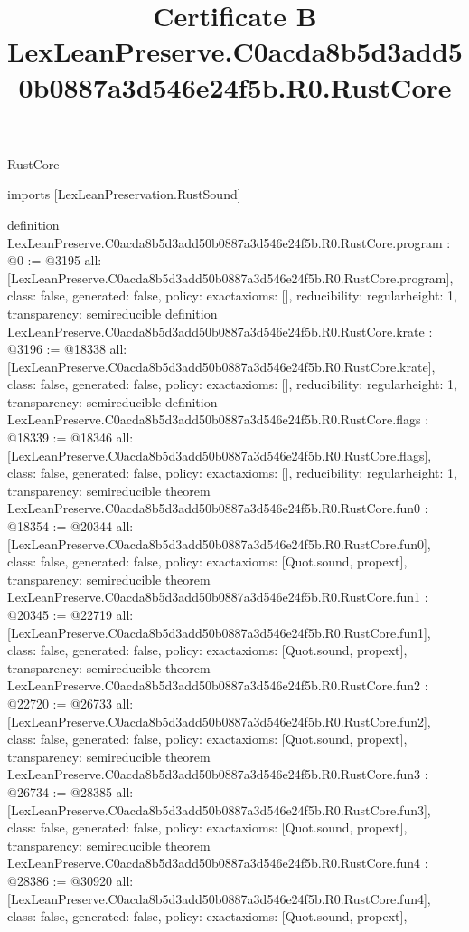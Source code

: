 \begin{lexlean}{RustCore}
\title{Certificate B LexLeanPreserve.C0acda8b5d3add50b0887a3d546e24f5b.R0.RustCore}
\begin{coremodule}
imports [LexLeanPreservation.RustSound]

definition LexLeanPreserve.C0acda8b5d3add50b0887a3d546e24f5b.R0.RustCore.program : @0 := @3195 {
  all: [LexLeanPreserve.C0acda8b5d3add50b0887a3d546e24f5b.R0.RustCore.program],
  class: false,
  generated: false,
  policy: exact{axioms: []},
  reducibility: regular{height: 1},
  transparency: semireducible
}
definition LexLeanPreserve.C0acda8b5d3add50b0887a3d546e24f5b.R0.RustCore.krate : @3196 := @18338 {
  all: [LexLeanPreserve.C0acda8b5d3add50b0887a3d546e24f5b.R0.RustCore.krate],
  class: false,
  generated: false,
  policy: exact{axioms: []},
  reducibility: regular{height: 1},
  transparency: semireducible
}
definition LexLeanPreserve.C0acda8b5d3add50b0887a3d546e24f5b.R0.RustCore.flags : @18339 := @18346 {
  all: [LexLeanPreserve.C0acda8b5d3add50b0887a3d546e24f5b.R0.RustCore.flags],
  class: false,
  generated: false,
  policy: exact{axioms: []},
  reducibility: regular{height: 1},
  transparency: semireducible
}
theorem LexLeanPreserve.C0acda8b5d3add50b0887a3d546e24f5b.R0.RustCore.fun0 : @18354 := @20344 {
  all: [LexLeanPreserve.C0acda8b5d3add50b0887a3d546e24f5b.R0.RustCore.fun0],
  class: false,
  generated: false,
  policy: exact{axioms: [Quot.sound, propext]},
  transparency: semireducible
}
theorem LexLeanPreserve.C0acda8b5d3add50b0887a3d546e24f5b.R0.RustCore.fun1 : @20345 := @22719 {
  all: [LexLeanPreserve.C0acda8b5d3add50b0887a3d546e24f5b.R0.RustCore.fun1],
  class: false,
  generated: false,
  policy: exact{axioms: [Quot.sound, propext]},
  transparency: semireducible
}
theorem LexLeanPreserve.C0acda8b5d3add50b0887a3d546e24f5b.R0.RustCore.fun2 : @22720 := @26733 {
  all: [LexLeanPreserve.C0acda8b5d3add50b0887a3d546e24f5b.R0.RustCore.fun2],
  class: false,
  generated: false,
  policy: exact{axioms: [Quot.sound, propext]},
  transparency: semireducible
}
theorem LexLeanPreserve.C0acda8b5d3add50b0887a3d546e24f5b.R0.RustCore.fun3 : @26734 := @28385 {
  all: [LexLeanPreserve.C0acda8b5d3add50b0887a3d546e24f5b.R0.RustCore.fun3],
  class: false,
  generated: false,
  policy: exact{axioms: [Quot.sound, propext]},
  transparency: semireducible
}
theorem LexLeanPreserve.C0acda8b5d3add50b0887a3d546e24f5b.R0.RustCore.fun4 : @28386 := @30920 {
  all: [LexLeanPreserve.C0acda8b5d3add50b0887a3d546e24f5b.R0.RustCore.fun4],
  class: false,
  generated: false,
  policy: exact{axioms: [Quot.sound, propext]},
}
\end{coremodule}
\end{lexlean}
